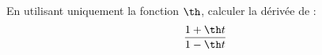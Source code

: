 En utilisant uniquement la fonction $\th$, calculer la d\'eriv\'ee de :
\begin{displaymath}
 \frac{1+\th t}{1 -\th t} 
\end{displaymath}
\bigskip \bigskip
